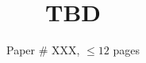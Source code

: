 \documentclass[sigconf,10pt]{acmart}
\begin{document}
\title{TBD}


\author{Paper \# XXX, $\leq 12$ pages}

\renewcommand{\shortauthors}{X.et al.}

\begin{abstract}
\end{abstract}

\maketitle



% 
% 
\end{document}
